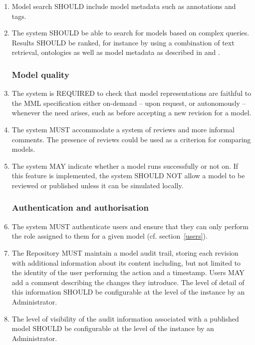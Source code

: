 \begin{enumerate}[1]
\item Model search SHOULD include model metadata such as annotations and tags.

\item The system SHOULD be able to search for models based on complex queries. Results SHOULD be ranked, for instance by using a combination of text retrieval, ontologies as well as model metadata as described in \cite{Henkel2010} and \cite{Schulz2011}. 

\subsubsection{Model quality}
\item The system is REQUIRED to check that model representations are faithful to the MML specification either on-demand -- upon request, or autonomously -- whenever the need arises, such as before accepting a new revision for a model. 

\item The system MUST accommodate a system of reviews and more informal comments. The presence of reviews could be used as a criterion for comparing models.

\item The system MAY indicate whether a model runs successfully or not on. If this feature is implemented, the system SHOULD NOT allow a model to be reviewed or published unless it can be simulated locally. 

\subsubsection{Authentication and authorisation}
\item The system MUST authenticate users and ensure that they can only perform the role assigned to them for a given model (cf. section~\ref{users}).

\item The Repository MUST maintain a model \gls{audit trail}, storing each revision with additional information about its content including, but not limited to the identity of the user performing the action and a timestamp. Users MAY add a comment describing the changes they introduce. The level of detail of this information SHOULD be configurable at the level of the instance by an Administrator. 

\item The level of visibility of the audit information associated with a published model SHOULD be configurable at the level of the instance by an Administrator.


\end{enumerate}
